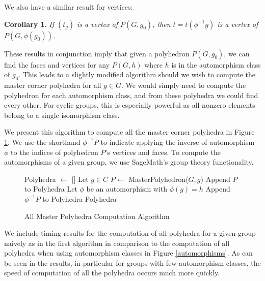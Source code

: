 \documentclass{article}
\newtheorem{corollary}{Corollary}
\begin{document}
	We also have a similar result for vertices:
	\begin{corollary}
		If $(t_g)$ is a vertex of $P(G, g_0)$, then $\bar{t} = t(\phi^{-1}g)$ is a vertex of $P(G, \phi(g_0))$.
	\end{corollary}

	These results in conjunction imply that given a polyhedron $P(G, g_0)$, we can find the faces and vertices for any $P(G, h)$ where $h$ is in the automorphism class of $g_0$. 
	This leads to a slightly modified algorithm should we wish to compute the master corner polyhedra for all $g \in G$. We would simply need to compute the polyhedron for each automorphism class, and from these polyhedra we could find every other. For cyclic groups, this is especially powerful as all nonzero elements belong to a single isomorphism class.
	
	We present this algorithm to compute all the master corner polyhedra in Figure \ref{alg2}. We use the shorthand $\phi^{-1}P$ to indicate applying the inverse of automorphism $\phi$ to the indices of polyhedron $P$'s vertices and faces. To compute the automorphisms of a given group, we use SageMath's group theory functionality.
	
	\begin{figure}
		\begin{algorithmic}
			\State Polyhedra $\gets$ []
				\State Let $g \in C$
				\State $P \gets $ MasterPolyhedron($G, g$)
				\State Append $P$ to Polyhedra
					\State Let $\phi$ be an automorphism with $\phi(g) = h$
					\State Append $\phi^{-1}P$ to Polyhedra
				\EndFor
			\EndFor
			\State \Return Polyhedra
			\EndFunction
		\end{algorithmic}
		\caption{All Master Polyhedra Computation Algorithm}
		\label{alg2}
	\end{figure}

	We include timing results for the computation of all polyhedra for a given group naively as in the first algorithm in comparison to the computation of all polyhedra when using automorphism classes in Figure \ref{automorphisms}. As can be seen in the results, in particular for groups with few automorphism classes, the speed of computation of all the polyhedra occurs much more quickly.
	
\end{document}
